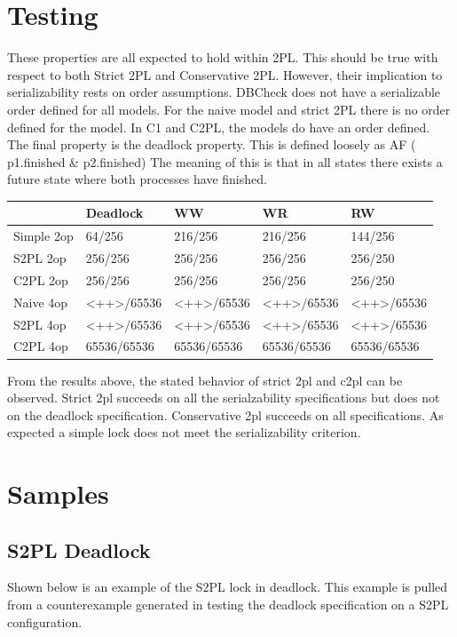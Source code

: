 \section{Testing}
These properties are all expected to hold within 2PL. This should be true with respect to both Strict 2PL and Conservative 2PL. However, their implication to serializability rests on order assumptions. DBCheck does not have a serializable order defined for all models. For the naive model and strict 2PL there is no order defined for the model. In C1 and C2PL, the models do have an order defined.  The final property is the deadlock property. This is defined loosely as 
AF ( p1.finished \& p2.finished)
The meaning of this is that in all states there exists a future state where both processes have finished.


\begin{tabular}{l||llll}
&Deadlock&WW&WR&RW\\\hline
Simple 2op&64/256&216/256&216/256&144/256\\
S2PL 2op&256/256&256/256&256/256&256/250\\
C2PL 2op&256/256&256/256&256/256&256/250\\
Naive 4op&<++>/65536&<++>/65536&<++>/65536&<++>/65536\\
S2PL 4op&<++>/65536&<++>/65536&<++>/65536&<++>/65536\\
C2PL 4op&65536/65536&65536/65536&65536/65536&65536/65536\\
\end{tabular}


From the results above, the stated behavior of strict 2pl and c2pl can be observed. Strict 2pl succeeds on all the serialzability specifications but does not on the deadlock specification. Conservative 2pl succeeds on all specifications. As expected a simple lock does not meet the serializability criterion. 

\section{Samples}
\subsection{S2PL Deadlock}
Shown below is an example of the S2PL lock in deadlock. This example is pulled from a counterexample generated in testing the deadlock specification on a S2PL configuration.

